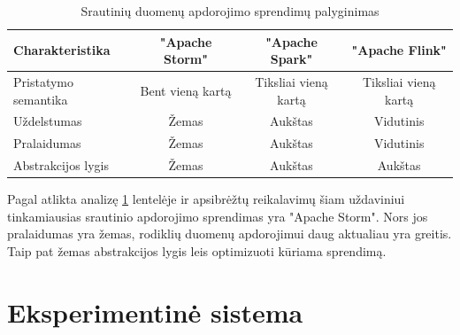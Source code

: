 \documentclass{VUMIFPSkursinis}
\begin{document}
\begin{table}[!htbp]
    \begin{center}
        \caption{Srautinių duomenų apdorojimo sprendimų palyginimas}
        \label{table:comparer}
        \begin{tabular}{ | l | c | c | c | } 
            \hline
            Charakteristika & "Apache Storm" & "Apache Spark" & "Apache Flink" \\* \hline
            Pristatymo semantika & Bent vieną kartą & Tiksliai vieną kartą & Tiksliai vieną kartą \\* \hline
            Uždelstumas & Žemas & Aukštas & Vidutinis \\* \hline
            Pralaidumas & Žemas & Aukštas & Vidutinis \\* \hline
            Abstrakcijos lygis & Žemas & Aukštas & Aukštas \\* \hline
        \end{tabular}
    \end{center}
\end{table}\par

Pagal atlikta analizę \ref{table:comparer} lentelėje ir apsibrėžtų reikalavimų šiam uždaviniui tinkamiausias srautinio apdorojimo sprendimas yra "Apache Storm". 
Nors jos pralaidumas yra žemas, rodiklių duomenų apdorojimui daug aktualiau yra greitis. Taip pat žemas abstrakcijos lygis leis optimizuoti kūriama sprendimą. 

\section{Eksperimentinė sistema}
\end{document}
